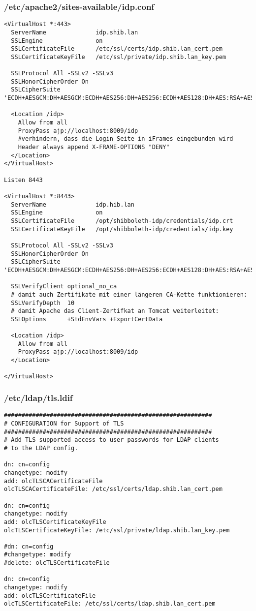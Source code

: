 \subsubsection{/etc/apache2/sites-available/idp.conf}
\begin{lstlisting}
<VirtualHost *:443>
  ServerName              idp.shib.lan
  SSLEngine               on
  SSLCertificateFile      /etc/ssl/certs/idp.shib.lan_cert.pem
  SSLCertificateKeyFile   /etc/ssl/private/idp.shib.lan_key.pem

  SSLProtocol All -SSLv2 -SSLv3
  SSLHonorCipherOrder On
  SSLCipherSuite 'ECDH+AESGCM:DH+AESGCM:ECDH+AES256:DH+AES256:ECDH+AES128:DH+AES:RSA+AESGCM:RSA+AES:ECDH+3DES:DH+3DES:RSA+3DES:!aNULL:!eNULL:!LOW:!RC4:!MD5:!EXP:!PSK:!DSS:!SEED:!ECDSA:!CAMELLIA'

  <Location /idp>
    Allow from all
    ProxyPass ajp://localhost:8009/idp
    #verhindern, dass die Login Seite in iFrames eingebunden wird
    Header always append X-FRAME-OPTIONS "DENY"
  </Location>
</VirtualHost>

Listen 8443

<VirtualHost *:8443>
  ServerName              idp.hib.lan
  SSLEngine               on
  SSLCertificateFile      /opt/shibboleth-idp/credentials/idp.crt
  SSLCertificateKeyFile   /opt/shibboleth-idp/credentials/idp.key

  SSLProtocol All -SSLv2 -SSLv3
  SSLHonorCipherOrder On
  SSLCipherSuite 'ECDH+AESGCM:DH+AESGCM:ECDH+AES256:DH+AES256:ECDH+AES128:DH+AES:RSA+AESGCM:RSA+AES:ECDH+3DES:DH+3DES:RSA+3DES:!aNULL:!eNULL:!LOW:!RC4:!MD5:!EXP:!PSK:!DSS:!SEED:!ECDSA:!CAMELLIA'

  SSLVerifyClient optional_no_ca
  # damit auch Zertifikate mit einer längeren CA-Kette funktionieren:
  SSLVerifyDepth  10
  # damit Apache das Client-Zertifkat an Tomcat weiterleitet:
  SSLOptions      +StdEnvVars +ExportCertData

  <Location /idp>
    Allow from all
    ProxyPass ajp://localhost:8009/idp
  </Location>

</VirtualHost>
\end{lstlisting}
\subsubsection{/etc/ldap/tls.ldif}
\begin{lstlisting}
###########################################################
# CONFIGURATION for Support of TLS
###########################################################
# Add TLS supported access to user passwords for LDAP clients
# to the LDAP config.

dn: cn=config
changetype: modify
add: olcTLSCACertificateFile
olcTLSCACertificateFile: /etc/ssl/certs/ldap.shib.lan_cert.pem

dn: cn=config
changetype: modify
add: olcTLSCertificateKeyFile
olcTLSCertificateKeyFile: /etc/ssl/private/ldap.shib.lan_key.pem

#dn: cn=config
#changetype: modify
#delete: olcTLSCertificateFile

dn: cn=config
changetype: modify
add: olcTLSCertificateFile
olcTLSCertificateFile: /etc/ssl/certs/ldap.shib.lan_cert.pem
\end{lstlisting}

